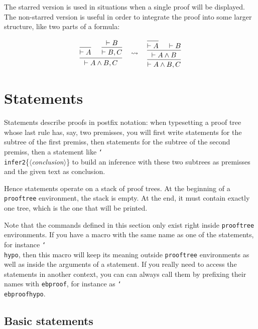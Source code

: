 \documentclass{article}
\newcommand\lit[1]{\texttt{#1}}
\newcommand\cs[1]{\lit{\char`\\#1}}
\newcommand\env[1]{\lit{#1}}
\newcommand\meta[1]{$\langle$\textit{#1}$\rangle$}
\newenvironment{example}[1]{%
  \def\exampleoptions{#1}%
  \VerbatimOut{example.tex}}{%
  \endVerbatimOut
  \begin{center}
  \begin{minipage}{.4\textwidth}
    
  \end{minipage}%
  \begin{minipage}{.6\textwidth}
    \small
    \expandafter\VerbatimInput\expandafter[\exampleoptions]{example.tex}
  \end{minipage}%
  \end{center}
}
\begin{document}
\noindent
The starred version is used in situations when a single proof will be
displayed.
The non-starred version is useful in order to integrate the proof into some
larger structure, like two parts of a formula:

\begin{example}{gobble=2}
  \[
    \begin{prooftree}
      \infer0{ \vdash A }
      \hypo{ \vdash B } \infer1{ \vdash B, C }
      \infer2{ \vdash A\wedge B, C }
    \end{prooftree}
    \quad \rightsquigarrow \quad
    \begin{prooftree}
      \infer0{ \vdash A } \hypo{ \vdash B }
      \infer2{ \vdash A\wedge B }
      \infer1{ \vdash A\wedge B, C }
    \end{prooftree}
  \]
\end{example}

\section{Statements}
\label{sec:statements}

Statements describe proofs in postfix notation: when typesetting a proof tree
whose last rule has, say, two premisses, you will first write statements for
the subtree of the first premiss, then statements for the subtree of the
second premiss, then a statement like \cs{infer2}\{\meta{conclusion}\} to
build an inference with these two subtrees as premisses and the given text as
conclusion.

Hence statements operate on a stack of proof trees.
At the beginning of a \lit{prooftree} environment, the stack is empty.
At the end, it must contain exactly one tree, which is the one that will be
printed.

Note that the commands defined in this section only exist right inside
\env{prooftree} environments.
If you have a macro with the same name as one of the statements, for instance
\cs{hypo}, then this macro will keep its meaning outside \env{prooftree}
environments as well as inside the arguments of a statement.
If you really need to access the statements in another context, you can can
always call them by prefixing their names with \lit{ebproof}, for instance as
\cs{ebproofhypo}.

\subsection{Basic statements}
\end{document}
